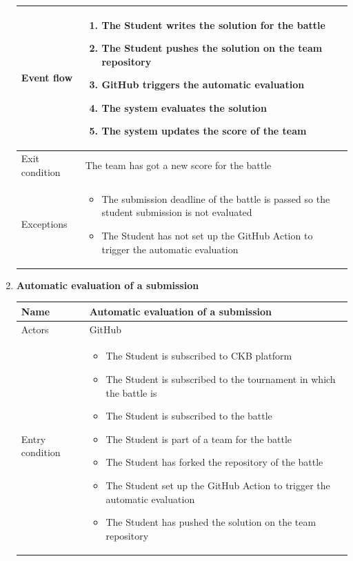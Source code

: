 \begin{enumerate}[label=UC\arabic*:]
\begin{tabular}{|p{3cm}|p{8cm}|}
        Event flow &
        \begin{enumerate}[label=\arabic*.]
            \item The Student writes the solution for the battle
            \item The Student pushes the solution on the team repository
            \item GitHub triggers the automatic evaluation
            \item The system evaluates the solution
            \item The system updates the score of the team
        \end{enumerate} \\
        \hline
        Exit condition & The team has got a new score for the battle \\
        \hline
        Exceptions &
        \begin{itemize}
            \item The submission deadline of the battle is passed so the student submission is not evaluated
            \item The Student has not set up the GitHub Action to trigger the automatic evaluation
        \end{itemize} \\
        \hline
    \end{tabular}
    \item \textbf{Automatic evaluation of a submission} \\
    \begin{tabular}{|p{3cm}|p{8cm}|}
        \hline
        Name & Automatic evaluation of a submission \\
        \hline
        Actors & GitHub \\
        \hline
        Entry condition &
        \begin{itemize}
            \item The Student is subscribed to CKB platform
            \item The Student is subscribed to the tournament in which the battle is
            \item The Student is subscribed to the battle
            \item The Student is part of a team for the battle
            \item The Student has forked the repository of the battle
            \item The Student set up the GitHub Action to trigger the automatic evaluation
            \item The Student has pushed the solution on the team repository

\end{itemize}
\end{tabular}
\end{enumerate}
